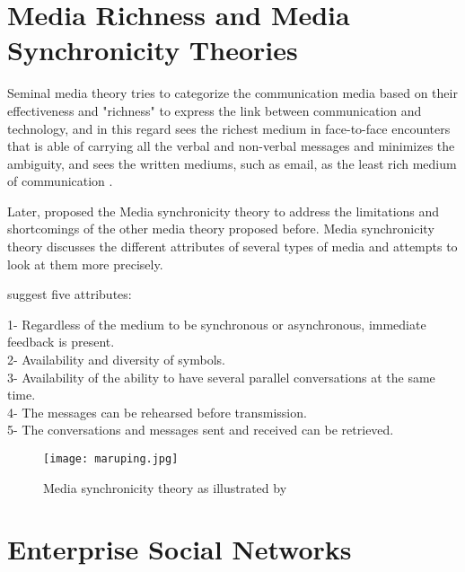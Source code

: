 \section{Media Richness and Media Synchronicity Theories}
\label{sec:media}

Seminal media theory tries to categorize the communication media based on their effectiveness and "richness" to express the link between communication and technology, and in this regard sees the richest medium in face-to-face encounters that is able of carrying all the verbal and non-verbal messages and minimizes the ambiguity, and sees the written mediums, such as email, as the least rich medium of communication \citep{Daft1986,Hassell2016}.

Later, \citet{Dennis2008} proposed the Media synchronicity theory to address the limitations and shortcomings of the other media theory proposed before. Media synchronicity theory discusses the different attributes of several types of media and attempts to look at them more precisely.

\citet{Dennis2008} suggest five attributes:

1- Regardless of the medium to be synchronous or asynchronous, immediate feedback is present.\\
2- Availability and diversity of symbols.\\
3- Availability of the ability to have several parallel conversations at the same time.\\
4- The messages can be rehearsed before transmission.\\
5- The conversations and messages sent and received can be retrieved.\\


\begin{figure}[hbt!]
\centering
\texttt{[image: maruping.jpg]}
\caption{Media synchronicity theory as illustrated by \citet{Maruping2004}}\label{fig:maruping}
\end{figure}

\section{Enterprise Social Networks}

